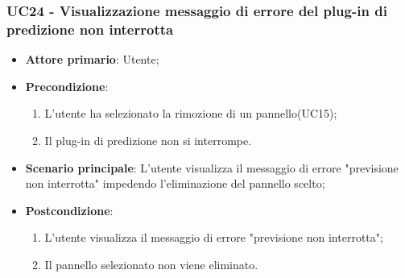 \subsubsection{UC24 - Visualizzazione messaggio di errore del plug-in di predizione non interrotta}
\label{sssec:uc24}
\begin{itemize}
  \item \textbf{Attore primario}: Utente;
  \item \textbf{Precondizione}:
  \begin{enumerate}
		\item L'utente ha selezionato la rimozione di un pannello(UC15);
		\item Il plug-in di predizione non si interrompe.
	\end{enumerate}
  \item \textbf{Scenario principale}: L'utente visualizza il messaggio di errore "previsione non interrotta" impedendo l'eliminazione del pannello scelto;
  \item \textbf{Postcondizione}:
  \begin{enumerate}
		\item L'utente visualizza il messaggio di errore "previsione non interrotta";
		\item Il pannello selezionato non viene eliminato.
	\end{enumerate}
\end{itemize}
